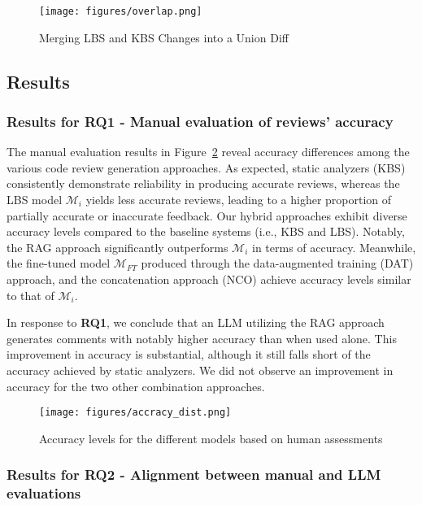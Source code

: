 \begin{figure}[hbt!]
  \centering
  \texttt{[image: figures/overlap.png]}
  \caption{Merging LBS and KBS Changes into a Union Diff}
  \label{fig:overlap} 
\end{figure}



\subsection{Results}

\subsubsection{Results for RQ1 - Manual evaluation of reviews' accuracy}

The manual evaluation results in Figure~\ref{fig:manual_judge} reveal accuracy differences among the various code review generation approaches. As expected, static analyzers (KBS) consistently demonstrate reliability in producing accurate reviews, whereas the LBS model \(\mathcal{M}_i\) yields less accurate reviews, leading to a higher proportion of partially accurate or inaccurate feedback.
Our hybrid approaches exhibit diverse accuracy levels compared to the baseline systems (i.e., KBS and LBS). Notably, the RAG approach significantly outperforms \(\mathcal{M}_i\) in terms of accuracy. Meanwhile, the fine-tuned model \(\mathcal{M}_{FT}\) produced through the data-augmented training (DAT) approach, and the concatenation approach (NCO) achieve accuracy levels similar to that of \(\mathcal{M}_i\).

In response to \textbf{RQ1}, we conclude that an LLM utilizing the RAG approach generates comments with notably higher accuracy than when used alone. This improvement in accuracy is substantial, although it still falls short of the accuracy achieved by static analyzers. We did not observe an improvement in accuracy for the two other combination approaches. 




\begin{figure}[htbp!]
  \centering
  \texttt{[image: figures/accracy\_dist.png]}
  \caption{Accuracy levels for the different models based on human assessments}
  \label{fig:manual_judge} 
\end{figure}

\subsubsection{Results for RQ2 - Alignment between manual and LLM evaluations}

